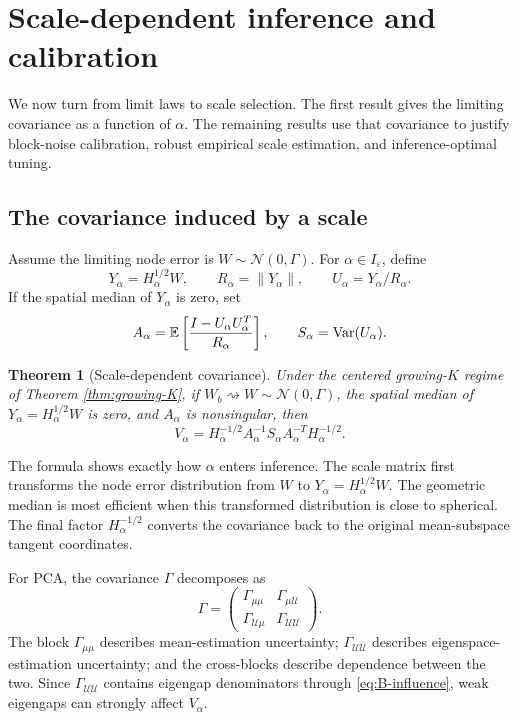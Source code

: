 \documentclass[11pt]{article}
\newtheorem{theorem}{Theorem}
\newcommand{\E}{\mathbb E}
\newcommand{\Var}{\operatorname{Var}}
\newcommand{\dto}{\rightsquigarrow}
\newcommand{\Normal}{\mathcal N}
\newcommand{\U}{\mathcal U}
\newcommand{\eps}{\varepsilon}
\begin{document}
\section{Scale-dependent inference and calibration}\label{sec:calibration}

We now turn from limit laws to scale selection.  The first result gives the limiting covariance as a function of \(\alpha\).  The remaining results use that covariance to justify block-noise calibration, robust empirical scale estimation, and inference-optimal tuning.

\subsection{The covariance induced by a scale}

Assume the limiting node error is \(W\sim\Normal(0,\Gamma)\).  For \(\alpha\in I_\eps\), define
\[
    Y_\alpha=H_\alpha^{1/2}W,
    \qquad
    R_\alpha=\|Y_\alpha\|,
    \qquad
    U_\alpha=Y_\alpha/R_\alpha.
\]
If the spatial median of \(Y_\alpha\) is zero, set
\begin{equation}\label{eq:A-alpha}
    A_\alpha=\E\left[{I-U_\alpha U_\alpha^T\over R_\alpha}\right],
    \qquad
    S_\alpha=\Var(U_\alpha).
\end{equation}

\begin{theorem}[Scale-dependent covariance]\label{thm:V-alpha}
Under the centered growing-\(K\) regime of Theorem \ref{thm:growing-K}, if \(W_b\dto W\sim\Normal(0,\Gamma)\), the spatial median of \(Y_\alpha=H_\alpha^{1/2}W\) is zero, and \(A_\alpha\) is nonsingular, then
\begin{equation}\label{eq:V-alpha}
    V_\alpha
    =H_\alpha^{-1/2}A_\alpha^{-1}S_\alpha A_\alpha^{-T}H_\alpha^{-1/2}.
\end{equation}
\end{theorem}

The formula shows exactly how \(\alpha\) enters inference.  The scale matrix first transforms the node error distribution from \(W\) to \(Y_\alpha=H_\alpha^{1/2}W\).  The geometric median is most efficient when this transformed distribution is close to spherical.  The final factor \(H_\alpha^{-1/2}\) converts the covariance back to the original mean-subspace tangent coordinates.

For PCA, the covariance \(\Gamma\) decomposes as
\begin{equation}\label{eq:Gamma-blocks}
    \Gamma=\begin{pmatrix}
        \Gamma_{\mu\mu} & \Gamma_{\mu\U}\\
        \Gamma_{\U\mu} & \Gamma_{\U\U}
    \end{pmatrix}.
\end{equation}
The block \(\Gamma_{\mu\mu}\) describes mean-estimation uncertainty; \(\Gamma_{\U\U}\) describes eigenspace-estimation uncertainty; and the cross-blocks describe dependence between the two.  Since \(\Gamma_{\U\U}\) contains eigengap denominators through \eqref{eq:B-influence}, weak eigengaps can strongly affect \(V_\alpha\).
\end{document}
